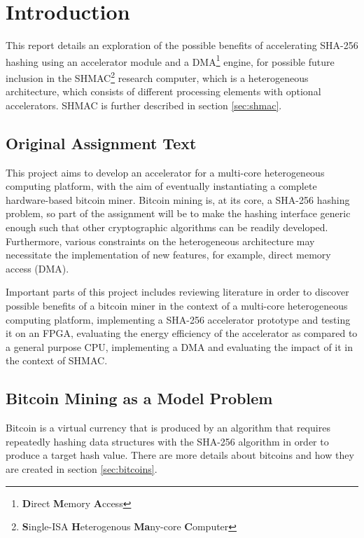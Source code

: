 \chapter{Introduction}

This report details an exploration of the possible benefits of accelerating
SHA-256 hashing using an accelerator module and a DMA\footnote{\textbf{D}irect \textbf{M}emory
\textbf{A}ccess} engine, for possible future inclusion in the SHMAC\footnote{\textbf{S}ingle-ISA \textbf{H}eterogenous \textbf{Ma}ny-core \textbf{C}omputer} research computer, which is a
heterogeneous architecture, which consists of different processing elements with
optional accelerators. SHMAC is further described in section \ref{sec:shmac}.

\section{Original Assignment Text}

This project aims to develop an accelerator for a multi-core heterogeneous
computing platform, with the aim of eventually instantiating a complete hardware-based bitcoin miner.
Bitcoin mining is, at its core, a SHA-256 hashing problem, so part of the
assignment will be to make the hashing interface generic enough such that other
cryptographic algorithms can be readily developed. Furthermore, various constraints
on the heterogeneous architecture may necessitate the implementation of new
features, for example, direct memory access (DMA).

Important parts of this project includes reviewing literature in order to discover
possible benefits of a bitcoin miner in the context of a multi-core heterogeneous
computing platform, implementing a SHA-256 accelerator prototype and testing it on
an FPGA, evaluating the energy efficiency of the accelerator as compared to a
general purpose CPU, implementing a DMA and evaluating the impact of it in the context
of SHMAC.

\section{Bitcoin Mining as a Model Problem}

Bitcoin is a virtual currency that is produced by an algorithm that
requires repeatedly hashing data structures with the SHA-256 algorithm
in order to produce a target hash value. There are more details about
bitcoins and how they are created in section \ref{sec:bitcoins}.

